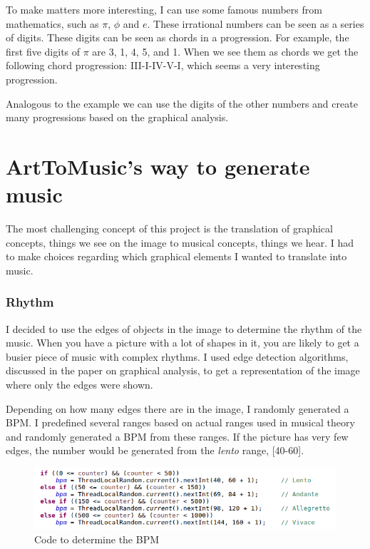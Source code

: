 \documentclass[12pt]{article}
\begin{document}
To make matters more interesting, I can use some famous numbers from mathematics, such as $\pi$, $\phi$ and $e$. These irrational numbers can be seen as a series of digits. These digits can be seen as chords in a progression. For example, the first five digits of $\pi$ are 3, 1, 4, 5, and 1. When we see them as chords we get the following chord progression: III-I-IV-V-I, which seems a very interesting progression.
\newline

Analogous to the example we can use the digits of the other numbers and create many progressions based on the graphical analysis.

\section{ArtToMusic's way to generate music}


The most challenging concept of this project is the translation of graphical concepts, things we see on the image to musical concepts, things we hear. I had to make choices regarding which graphical elements I wanted to translate into music.

\subsubsection{Rhythm}

I decided to use the edges of objects in the image to determine the rhythm of the music. When you have a picture with a lot of shapes in it, you are likely to get a busier piece of music with complex rhythms. I used edge detection algorithms, discussed in the paper on graphical analysis, to get a representation of the image where only the edges were shown.

Depending on how many edges there are in the image, I randomly generated a BPM. I predefined several ranges based on actual ranges used in musical theory and randomly generated a BPM from these ranges.
If the picture has very few edges, the number would be generated from the \textit{lento} range, [40-60].

\begin{figure}[h]
\centering
\hbox{\hspace{-1.3em}\includegraphics[scale=0.7]{img/bpm_code}}
\caption{Code to determine the BPM}
\end{figure}
\end{document}
